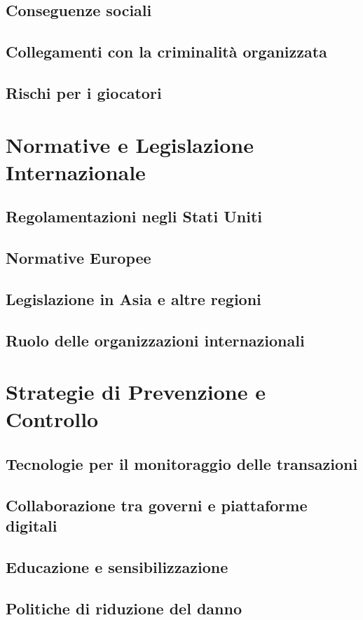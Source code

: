 \documentclass[a4paper,12pt]{article}
\begin{document}
\subsection{Conseguenze sociali}
\subsection{Collegamenti con la criminalità organizzata}
\subsection{Rischi per i giocatori}

\section{Normative e Legislazione Internazionale}
\subsection{Regolamentazioni negli Stati Uniti}
\subsection{Normative Europee}
\subsection{Legislazione in Asia e altre regioni}
\subsection{Ruolo delle organizzazioni internazionali}

\section{Strategie di Prevenzione e Controllo}
\subsection{Tecnologie per il monitoraggio delle transazioni}
\subsection{Collaborazione tra governi e piattaforme digitali}
\subsection{Educazione e sensibilizzazione}
\subsection{Politiche di riduzione del danno}
\end{document}

